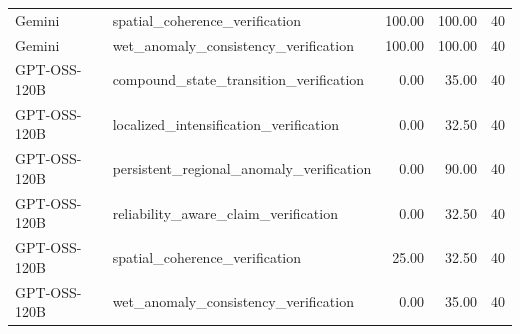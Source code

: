 \begin{tabular}{llrrr}
Gemini & spatial_coherence_verification & 100.00 & 100.00 & 40 \\
Gemini & wet_anomaly_consistency_verification & 100.00 & 100.00 & 40 \\
GPT-OSS-120B & compound_state_transition_verification & 0.00 & 35.00 & 40 \\
GPT-OSS-120B & localized_intensification_verification & 0.00 & 32.50 & 40 \\
GPT-OSS-120B & persistent_regional_anomaly_verification & 0.00 & 90.00 & 40 \\
GPT-OSS-120B & reliability_aware_claim_verification & 0.00 & 32.50 & 40 \\
GPT-OSS-120B & spatial_coherence_verification & 25.00 & 32.50 & 40 \\
GPT-OSS-120B & wet_anomaly_consistency_verification & 0.00 & 35.00 & 40 \\
\bottomrule
\end{tabular}
